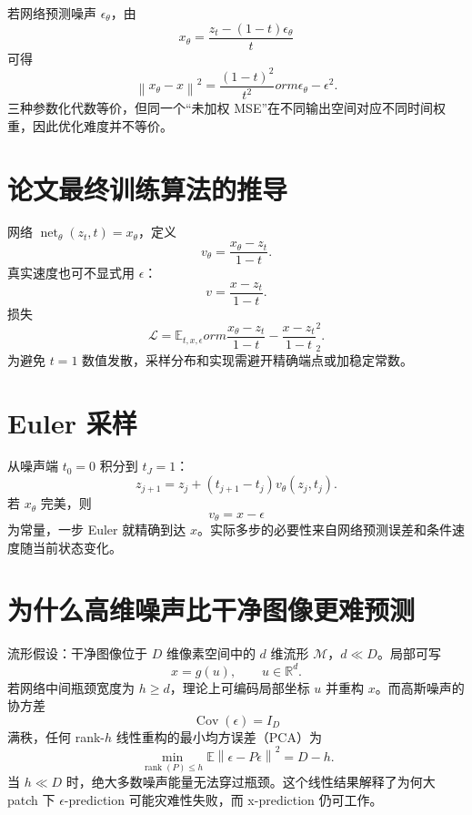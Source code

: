 \documentclass[UTF8,12pt,a4paper,fontset=none]{ctexart}
\numberwithin{equation}{section}
\newcommand{\R}{\mathbb{R}}
\newcommand{\E}{\mathbb{E}}
\newcommand{\Loss}{\mathcal{L}}
\newcommand{\norm}[1]{\left\lVert #1\right\rVert}
\newcommand{\rank}{\operatorname{rank}}
\begin{document}
若网络预测噪声 $\epsilon_\theta$，由
\begin{equation}
 x_\theta=\frac{z_t-(1-t)\epsilon_\theta}{t}
\end{equation}
可得
\begin{equation}
 \norm{x_\theta-x}^2=\frac{(1-t)^2}{t^2}
orm{\epsilon_\theta-\epsilon}^2.
\end{equation}
三种参数化代数等价，但同一个“未加权 MSE”在不同输出空间对应不同时间权重，因此优化难度并不等价。

\section{论文最终训练算法的推导}
网络 $\operatorname{net}_\theta(z_t,t)=x_\theta$，定义
\begin{equation}
 v_\theta=\frac{x_\theta-z_t}{1-t}.
\end{equation}
真实速度也可不显式用 $\epsilon$：
\begin{equation}
 v=\frac{x-z_t}{1-t}.
\end{equation}
损失
\begin{equation}
 \boxed{\Loss=\E_{t,x,\epsilon}
orm{
 \frac{x_\theta-z_t}{1-t}-\frac{x-z_t}{1-t}}_2^2}.
\end{equation}
为避免 $t=1$ 数值发散，采样分布和实现需避开精确端点或加稳定常数。

\section{Euler 采样}
从噪声端 $t_0=0$ 积分到 $t_J=1$：
\begin{equation}
 z_{j+1}=z_j+(t_{j+1}-t_j)v_\theta(z_j,t_j).
\end{equation}
若 $x_\theta$ 完美，则
\begin{equation}
 v_\theta=x-\epsilon
\end{equation}
为常量，一步 Euler 就精确到达 $x$。实际多步的必要性来自网络预测误差和条件速度随当前状态变化。

\section{为什么高维噪声比干净图像更难预测}
流形假设：干净图像位于 $D$ 维像素空间中的 $d$ 维流形 $\mathcal M$，$d\ll D$。局部可写
\begin{equation}
 x=g(u),\qquad u\in\R^d.
\end{equation}
若网络中间瓶颈宽度为 $h\ge d$，理论上可编码局部坐标 $u$ 并重构 $x$。而高斯噪声的协方差
\begin{equation}
 \operatorname{Cov}(\epsilon)=I_D
\end{equation}
满秩，任何 rank-$h$ 线性重构的最小均方误差（PCA）为
\begin{equation}
 \min_{\rank(P)\le h}\E\norm{\epsilon-P\epsilon}^2=D-h.
\end{equation}
当 $h\ll D$ 时，绝大多数噪声能量无法穿过瓶颈。这个线性结果解释了为何大 patch 下 $\epsilon$-prediction 可能灾难性失败，而 x-prediction 仍可工作。
\end{document}
